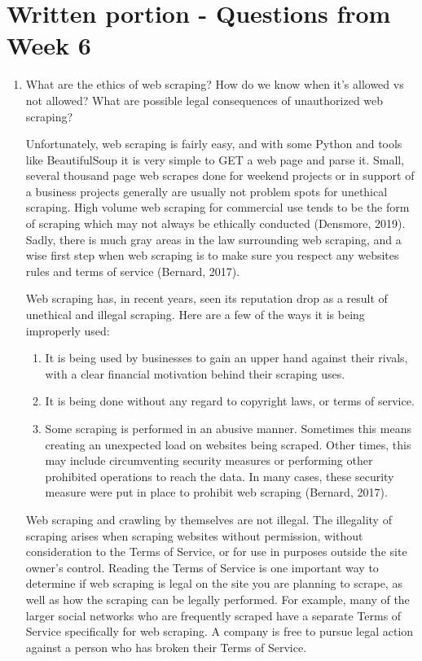 \documentclass[]{article}
\begin{document}
\section{Written portion - Questions from Week 6}
\begin{enumerate}
	\item What are the ethics of web scraping? How do we know when it's allowed vs not allowed? What are possible legal consequences of unauthorized web scraping?
	
	Unfortunately, web scraping is fairly easy, and with some Python and tools like BeautifulSoup it is very simple to GET a web page and parse it.  Small, several thousand page web scrapes done for weekend projects or in support of a business projects generally are usually not problem spots for unethical scraping.  High volume web scraping for commercial use tends to be the form of scraping which may not always be ethically conducted (Densmore, 2019).  Sadly, there is much gray areas in the law surrounding web scraping, and a wise first step when web scraping is to make sure you respect any websites rules and terms of service (Bernard, 2017). 
	
	Web scraping has, in recent years, seen its reputation drop as a result of unethical and illegal scraping.  Here are a few of the ways it is being improperly used:
	\begin{enumerate}
		\item It is being used by businesses to gain an upper hand against their rivals, with a clear financial motivation behind their scraping uses.
		\item It is being done without any regard to copyright laws, or terms of service.
		\item Some scraping is performed in an abusive manner.  Sometimes this means creating an unexpected load on websites being scraped.  Other times, this may include circumventing security measures or performing other prohibited operations to reach the data.  In many cases, these security measure were put in place to prohibit web scraping (Bernard, 2017).
	\end{enumerate}
	
	Web scraping and crawling by themselves are not illegal.  The illegality of scraping arises when scraping websites without permission, without consideration to the Terms of Service, or for use in purposes outside the site owner's control.  Reading the Terms of Service is one important way to determine if web scraping is legal on the site you are planning to scrape, as well as how the scraping can be legally performed.  For example, many of the larger social networks who are frequently scraped have a separate Terms of Service specifically for web scraping.  A company is free to pursue legal action against a person who has broken their Terms of Service.
	

\end{enumerate}
\end{document}
